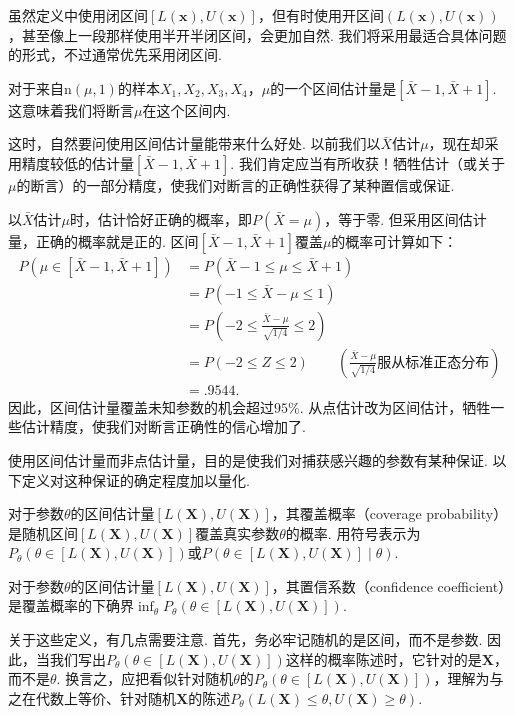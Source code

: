 虽然定义中使用闭区间$[L(\boldsymbol x),U(\boldsymbol x)]$，但有时使用开区间$(L(\boldsymbol x),U(\boldsymbol x))$，甚至像上一段那样使用半开半闭区间，会更加自然. 我们将采用最适合具体问题的形式，不过通常优先采用闭区间.
\begin{example}[区间估计量]\label{ex:9.1.2}
对于来自$\mathrm n(\mu,1)$的样本$X_1,X_2,X_3,X_4$，$\mu$的一个区间估计量是$[\bar X-1,\bar X+1]$. 这意味着我们将断言$\mu$在这个区间内.
\end{example}
这时，自然要问使用区间估计量能带来什么好处. 以前我们以$\bar X$估计$\mu$，现在却采用精度较低的估计量$[\bar X-1,\bar X+1]$. 我们肯定应当有所收获！牺牲估计（或关于$\mu$的断言）的一部分精度，使我们对断言的正确性获得了某种置信或保证.
\begin{example}[续\autoref{ex:9.1.2}]\label{ex:9.1.3}
以$\bar X$估计$\mu$时，估计恰好正确的概率，即$P(\bar X=\mu)$，等于零. 但采用区间估计量，正确的概率就是正的. 区间$[\bar X-1,\bar X+1]$覆盖$\mu$的概率可计算如下：
$$\begin{aligned}
P(\mu\in[\bar X-1,\bar X+1])
&=P(\bar X-1\le\mu\le\bar X+1)\\
&=P(-1\le\bar X-\mu\le1)\\
&=P\left(-2\le\frac{\bar X-\mu}{\sqrt{1/4}}\le2\right)\\
&=P(-2\le Z\le2)\qquad\left(\frac{\bar X-\mu}{\sqrt{1/4}}\text{服从标准正态分布}\right)\\
&=.9544.
\end{aligned}$$
因此，区间估计量覆盖未知参数的机会超过$95\%$. 从点估计改为区间估计，牺牲一些估计精度，使我们对断言正确性的信心增加了.
\end{example}
使用区间估计量而非点估计量，目的是使我们对捕获感兴趣的参数有某种保证. 以下定义对这种保证的确定程度加以量化.
\begin{definition}\label{def:9.1.4}
对于参数$\theta$的区间估计量$[L(\boldsymbol X),U(\boldsymbol X)]$，其覆盖概率（coverage probability）是随机区间$[L(\boldsymbol X),U(\boldsymbol X)]$覆盖真实参数$\theta$的概率. 用符号表示为$P_\theta(\theta\in[L(\boldsymbol X),U(\boldsymbol X)])$或$P(\theta\in[L(\boldsymbol X),U(\boldsymbol X)]\mid\theta)$.
\end{definition}
\begin{definition}\label{def:9.1.5}
对于参数$\theta$的区间估计量$[L(\boldsymbol X),U(\boldsymbol X)]$，其置信系数（confidence coefficient）是覆盖概率的下确界$\inf_\theta P_\theta(\theta\in[L(\boldsymbol X),U(\boldsymbol X)])$.
\end{definition}
关于这些定义，有几点需要注意. 首先，务必牢记随机的是区间，而不是参数. 因此，当我们写出$P_\theta(\theta\in[L(\boldsymbol X),U(\boldsymbol X)])$这样的概率陈述时，它针对的是$\boldsymbol X$，而不是$\theta$. 换言之，应把看似针对随机$\theta$的$P_\theta(\theta\in[L(\boldsymbol X),U(\boldsymbol X)])$，理解为与之在代数上等价、针对随机$\boldsymbol X$的陈述$P_\theta(L(\boldsymbol X)\le\theta,U(\boldsymbol X)\ge\theta)$.

